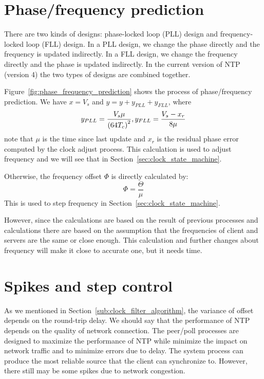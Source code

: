 

\section{Phase/frequency prediction}%
\label{sec:phase_frequency_prediction}
There are two kinds of designs: phase-locked loop (PLL) design and
frequency-locked loop (FLL) design. In a PLL design, we change the phase
directly and the frequency is updated indirectly. In a FLL design, we change
the frequency directly and the phase is updated indirectly. In the current
version of NTP (version 4) the two types of designs are combined together. 

Figure~\ref{fig:phase_frequency_prediction} shows the process of phase/frequency
prediction. We have $x = V_s$ and $y = y + y_{PLL} + y_{FLL}$, where
\begin{equation}
    y_{PLL} = \frac{V_s\mu}{\left(64T_c\right)^2},\\
    y_{FLL} = \frac{V_s-x_r}{8\mu}
    \label{eq:y_pll}
\end{equation}
note that $\mu$ is the time since last update and $x_r$ is the residual phase
error computed by the clock adjust process. This calculation is used to adjust
frequency and we will see that in Section~\ref{sec:clock_state_machine}.

Otherwise, the frequency offset $\Phi$ is directly calculated by:
\begin{equation}
    \Phi = \frac{\Theta}{\mu}
    \label{eq:frequency_offset}
\end{equation}
This is used to step frequency in Section~\ref{sec:clock_state_machine}. 

However, since the calculations are based on the result of previous processes
and calculations there are based on the assumption that the frequencies of client
and servers are the same or close enough. This calculation and further changes
about frequency will make it close to accurate one, but it needs time.



\section{Spikes and step control}%
\label{sec:spikes_and_step_control}
As we mentioned in Section~\ref{sub:clock_filter_algorithm}, the variance of
offset depends on the round-trip delay. We should say that the performance of
NTP depends on the quality of network connection. The peer/poll processes are
designed to maximize the performance of NTP while minimize the impact on
network traffic and to minimize errors due to delay. The system process can
produce the most reliable source that the client can synchronize to. However, 
there still may be some spikes due to network congestion. 


